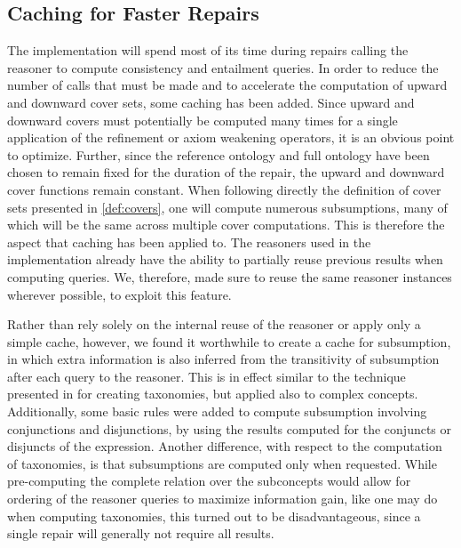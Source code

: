 \subsection{Caching for Faster Repairs}\label{cache-impl}

The implementation will spend most of its time during repairs calling the reasoner to compute consistency and entailment queries. In order to reduce the number of calls that must be made and to accelerate the computation of upward and downward cover sets, some caching has been added. Since upward and downward covers must potentially be computed many times for a single application of the refinement or axiom weakening operators, it is an obvious point to optimize. Further, since the reference ontology and full ontology have been chosen to remain fixed for the duration of the repair, the upward and downward cover functions remain constant. When following directly the definition of cover sets presented in \cref{def:covers}, one will compute numerous subsumptions, many of which will be the same across multiple cover computations. This is therefore the aspect that caching has been applied to. The reasoners used in the implementation already have the ability to partially reuse previous results when computing queries. We, therefore, made sure to reuse the same reasoner instances wherever possible, to exploit this feature.

Rather than rely solely on the internal reuse of the reasoner or apply only a simple cache, however, we found it worthwhile to create a cache for subsumption, in which extra information is also inferred from the transitivity of subsumption after each query to the reasoner. This is in effect similar to the technique presented in \cite{shearer2009exploiting} for creating taxonomies, but applied also to complex concepts. Additionally, some basic rules were added to compute subsumption involving conjunctions and disjunctions, by using the results computed for the conjuncts or disjuncts of the expression. Another difference, with respect to the computation of taxonomies, is that subsumptions are computed only when requested. While pre-computing the complete relation over the subconcepts would allow for ordering of the reasoner queries to maximize information gain, like one may do when computing taxonomies, this turned out to be disadvantageous, since a single repair will generally not require all results. 

